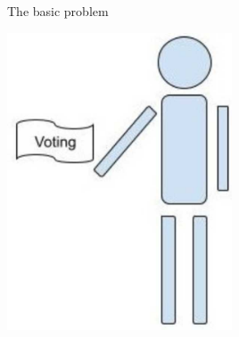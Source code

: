 \begin{frame}{The basic problem}
\begin{minipage}{0.45\textwidth}
    \centering
\end{minipage}
\begin{minipage}{0.45\textwidth}
    \centering
    \includegraphics[width=0.5\textwidth]{static_figures/voting_man.jpg}
\end{minipage}


\end{frame}
